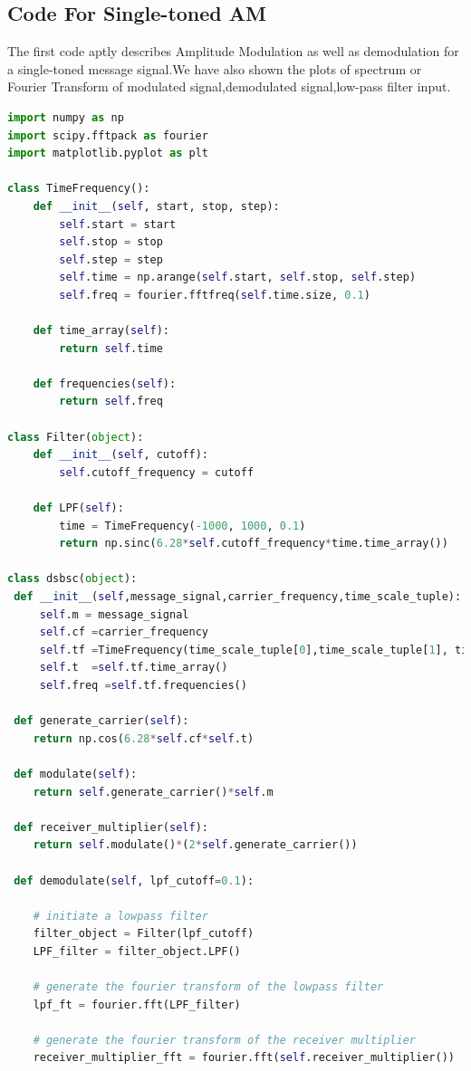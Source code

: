 \documentclass[12pt,a4paper]{article}%
\begin{document}
	\subsection{Code For Single-toned AM}
	\begin{flushleft}The first code aptly describes Amplitude Modulation as well as demodulation for a single-toned message signal.We have also shown the plots of spectrum or Fourier Transform of modulated signal,demodulated signal,low-pass filter input.
		\lstset{numbers=none,breaklines=true,} 
		\begin{lstlisting}[language=python]
import numpy as np
import scipy.fftpack as fourier
import matplotlib.pyplot as plt
	
class TimeFrequency():
	def __init__(self, start, stop, step):
		self.start = start
		self.stop = stop
		self.step = step
		self.time = np.arange(self.start, self.stop, self.step)
		self.freq = fourier.fftfreq(self.time.size, 0.1)
	
	def time_array(self):
		return self.time
	
	def frequencies(self):
		return self.freq
	
class Filter(object):
	def __init__(self, cutoff):
		self.cutoff_frequency = cutoff
			
	def LPF(self):
		time = TimeFrequency(-1000, 1000, 0.1)
		return np.sinc(6.28*self.cutoff_frequency*time.time_array())
	
class dsbsc(object):
 def __init__(self,message_signal,carrier_frequency,time_scale_tuple):
	 self.m = message_signal
	 self.cf =carrier_frequency
	 self.tf =TimeFrequency(time_scale_tuple[0],time_scale_tuple[1], time_scale_tuple[2])
	 self.t  =self.tf.time_array()
	 self.freq =self.tf.frequencies()
		
 def generate_carrier(self):
	return np.cos(6.28*self.cf*self.t)
		
 def modulate(self):
	return self.generate_carrier()*self.m
		
 def receiver_multiplier(self):
	return self.modulate()*(2*self.generate_carrier())
		
 def demodulate(self, lpf_cutoff=0.1):
		
	# initiate a lowpass filter
	filter_object = Filter(lpf_cutoff)
	LPF_filter = filter_object.LPF()
	
	# generate the fourier transform of the lowpass filter
	lpf_ft = fourier.fft(LPF_filter)
	
	# generate the fourier transform of the receiver multiplier
	receiver_multiplier_fft = fourier.fft(self.receiver_multiplier())
	

\end{lstlisting}
\end{flushleft}
\end{document}

